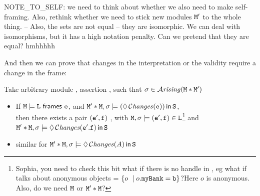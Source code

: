 \documentclass[acmsmall,screen]{acmart}
\begin{document}
NOTE\_TO\_SELF: we need to think about whether we also need to make  self-framing.
Also, rethink whether we need to stick new modules ${\mbox{\tt{M}}}'$ to the whole thing.
--
Also, the sets are not equal -- they are isomorphic. We can deal with isomorphisms, but
it has a high notation penalty. Can we pretend that they are equal? hmhhhhh


And then we can prove that changes in the interpretation or the validity require a change in the frame:

\begin{lemma}
Take arbitrary module \M, assertion \A, such that  $\sigma\in{\mathcal{A}}\textrm{\textit{rising}}({{\mbox{\tt{M}}}*{\mbox{\tt{M}}}'})$

\begin{itemize}
\item
If  ${\mbox{\tt{M}}}  \models {\mbox{\tt{L}}} ~{\bf{\sf {frames}}}~ {\mbox{\tt{e}}}$, and
${\mbox{\tt{M}}}'*{\mbox{\tt{M}}}, \sigma \models (\lozenge\, \mathcal{C}\textrm{\textit{hanges}}({\mbox{\tt{e}}}))\,{\bf{\sf {in}}}\, {\mbox{\tt{S}}}$, \\
then there exists a pair $({\mbox{\tt{e}}}',{\mbox{\tt{f}}})$ , with
${\mbox{\tt{M}}},\sigma \models ({\mbox{\tt{e}}}',{\mbox{\tt{f}}})\in {\mbox{\tt{L}}}$\footnote{Sophia, you need to check this bit  what if 
there is no handle in , eg what if  talks about anonymous objects
\eg {} = $\{ o \ \mid o.{\mbox{\tt{myBank}}}={\mbox{\tt{b}}} \}$?Here $o$ is anonymous. Also, do we need ${\mbox{\tt{M}}}$ or ${\mbox{\tt{M}}}'*{\mbox{\tt{M}}}$?}
and ${\mbox{\tt{M}}}'*{\mbox{\tt{M}}}, \sigma \models  \lozenge\, \mathcal{C}\textrm{\textit{hanges}}({\mbox{\tt{e}}}'.{\mbox{\tt{f}}})\,{\bf{\sf {in}}}\, {\mbox{\tt{S}}}$

\item
similar for
${\mbox{\tt{M}}}'*{\mbox{\tt{M}}}, \sigma \models \lozenge\, \mathcal{C}\textrm{\textit{hanges}}(A)\,{\bf{\sf {in}}}\, {\mbox{\tt{S}}}$
\end{itemize}

\end{lemma}
\end{document}
